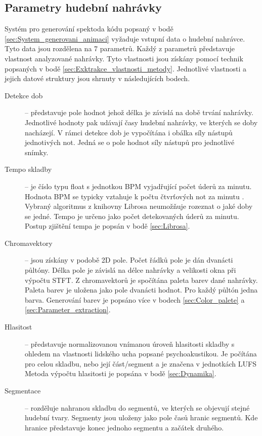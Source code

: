 \subsection{Parametry hudební nahrávky} \label{sec:Parametry_nahravky}

Systém pro generování spektoda kódu popsaný v bodě \ref{sec:System_generovani_animaci} vyžaduje vstupní data o hudební nahrávce. Tyto data jsou rozdělena na 7 parametrů. Každý z parametrů představuje vlastnost analyzované nahrávky. Tyto vlastnosti jsou získány pomocí technik popsaných v bodě \ref{sec:Exktrakce_vlastnosti_metody}. Jednotlivé vlastnosti a jejich datové struktury jsou shrnuty v následujících bodech.

\begin{description}
    \item[Detekce dob] -- představuje pole hodnot jehož délka je závislá na době trvání nahrávky. Jednotlivé hodnoty pak udávají časy hudební nahrávky, ve kterých se doby nacházejí. V rámci detekce dob je vypočítána i obálka síly nástupů jednotivých not. Jedná se o pole hodnot síly nástupů pro jednotlivé snímky. 
    
    \item[Tempo skladby] -- je číslo typu float s jednotkou \acs{BPM} vyjadřující počet úderů za minutu. Hodnota BPM se typicky vztahuje k počtu čtvrťových not za minutu \cite{Harvard_dictionary_of_music}. Vybraný algoritmus z knihovny Librosa neumožňuje rozeznat o jaké doby se jedné. Tempo je určeno jako počet detekovaných úderů za minutu. Postup zjištění tempa je popsán v bodě \ref{sec:Librosa}.

    \item[Chromavektory] -- jsou získány v podobě 2D pole. Počet řádků pole je dán dvanácti půltóny. Délka pole je závislá na délce nahrávky a velikosti okna při výpočtu \acs{STFT}. Z chromavektorů je spočítána paleta barev dané nahrávky. Paleta barev je uložena jako pole dvanácti hodnot. Pro každý půltón jedna barva. Generování barev je popsáno více v bodech \ref{sec:Color_palete} a \ref{sec:Parameter_extraction}.

    \item[Hlasitost] -- představuje normalizovanou vnímanou úroveň hlasitosti skladby s ohledem na vlastnosti lidského ucha popsané psychoakustikou. Je počítána pro celou skladbu, nebo její část/segment a je značena v jednotkách \acs{LUFS} Metoda výpočtu hlasitosti je popsána v bodě \ref{sec:Dynamika}.

    \item[Segmentace] -- rozděluje nahranou skladbu do segmentů, ve kterých se objevují stejné hudební tvary. Segmenty jsou uloženy jako pole časů hranic segmentů. Kde hranice představuje konec jednoho segmentu a začátek druhého. 


\end{description}
